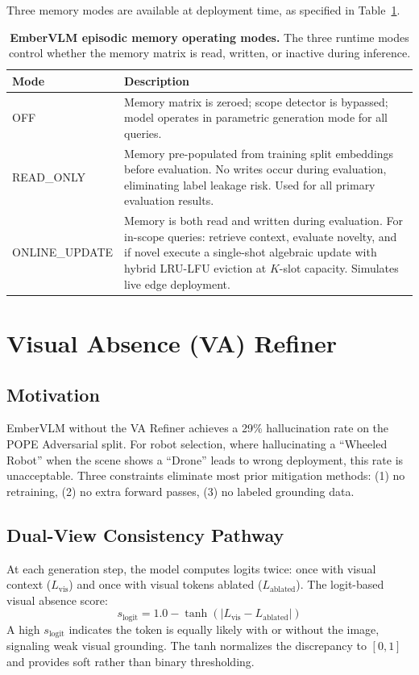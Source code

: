 Three memory modes are available at deployment time, as specified in Table~\ref{tab:memory_modes_spec}.

\begin{table}[htbp]
\centering
\caption{\textbf{EmberVLM episodic memory operating modes.} The three runtime modes control whether the memory matrix is read, written, or inactive during inference.}
\label{tab:memory_modes_spec}
\begin{tabularx}{\textwidth}{lX}
\toprule
\textbf{Mode} & \textbf{Description} \\
\midrule
OFF & Memory matrix is zeroed; scope detector is bypassed; model operates in parametric generation mode for all queries. \\
\midrule
READ\_ONLY & Memory pre-populated from training split embeddings before evaluation. No writes occur during evaluation, eliminating label leakage risk. Used for all primary evaluation results. \\
\midrule
ONLINE\_UPDATE & Memory is both read and written during evaluation. For in-scope queries: retrieve context, evaluate novelty, and if novel execute a single-shot algebraic update with hybrid LRU-LFU eviction at $K$-slot capacity. Simulates live edge deployment. \\
\bottomrule
\end{tabularx}
\end{table}

\section{Visual Absence (VA) Refiner}
\label{sec:embervlm_refiner}

\subsection{Motivation}
EmberVLM without the VA Refiner achieves a 29\% hallucination rate on the POPE Adversarial split. For robot selection, where hallucinating a ``Wheeled Robot'' when the scene shows a ``Drone'' leads to wrong deployment, this rate is unacceptable. Three constraints eliminate most prior mitigation methods: (1) no retraining, (2) no extra forward passes, (3) no labeled grounding data.

\subsection{Dual-View Consistency Pathway}
At each generation step, the model computes logits twice: once with visual context ($L_{\text{vis}}$) and once with visual tokens ablated ($L_{\text{ablated}}$). The logit-based visual absence score:
\begin{equation}
    s_{\text{logit}} = 1.0 - \tanh\!\left(\left|L_{\text{vis}} - L_{\text{ablated}}\right|\right)
    \label{eq:va_logit}
\end{equation}
A high $s_{\text{logit}}$ indicates the token is equally likely with or without the image, signaling weak visual grounding. The tanh normalizes the discrepancy to $[0, 1]$ and provides soft rather than binary thresholding.

